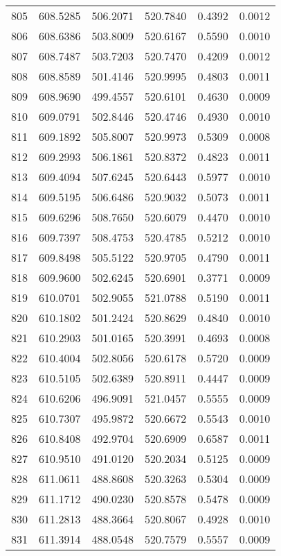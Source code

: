 \documentclass{article}
\begin{document}
\begin{longtable}{|c|c|c|c|c|c|}
805 & 608.5285 & 506.2071 & 520.7840 & 0.4392 & 0.0012 \\
806 & 608.6386 & 503.8009 & 520.6167 & 0.5590 & 0.0010 \\
807 & 608.7487 & 503.7203 & 520.7470 & 0.4209 & 0.0012 \\
808 & 608.8589 & 501.4146 & 520.9995 & 0.4803 & 0.0011 \\
809 & 608.9690 & 499.4557 & 520.6101 & 0.4630 & 0.0009 \\
810 & 609.0791 & 502.8446 & 520.4746 & 0.4930 & 0.0010 \\
811 & 609.1892 & 505.8007 & 520.9973 & 0.5309 & 0.0008 \\
812 & 609.2993 & 506.1861 & 520.8372 & 0.4823 & 0.0011 \\
813 & 609.4094 & 507.6245 & 520.6443 & 0.5977 & 0.0010 \\
814 & 609.5195 & 506.6486 & 520.9032 & 0.5073 & 0.0011 \\
815 & 609.6296 & 508.7650 & 520.6079 & 0.4470 & 0.0010 \\
816 & 609.7397 & 508.4753 & 520.4785 & 0.5212 & 0.0010 \\
817 & 609.8498 & 505.5122 & 520.9705 & 0.4790 & 0.0011 \\
818 & 609.9600 & 502.6245 & 520.6901 & 0.3771 & 0.0009 \\
819 & 610.0701 & 502.9055 & 521.0788 & 0.5190 & 0.0011 \\
820 & 610.1802 & 501.2424 & 520.8629 & 0.4840 & 0.0010 \\
821 & 610.2903 & 501.0165 & 520.3991 & 0.4693 & 0.0008 \\
822 & 610.4004 & 502.8056 & 520.6178 & 0.5720 & 0.0009 \\
823 & 610.5105 & 502.6389 & 520.8911 & 0.4447 & 0.0009 \\
824 & 610.6206 & 496.9091 & 521.0457 & 0.5555 & 0.0009 \\
825 & 610.7307 & 495.9872 & 520.6672 & 0.5543 & 0.0010 \\
826 & 610.8408 & 492.9704 & 520.6909 & 0.6587 & 0.0011 \\
827 & 610.9510 & 491.0120 & 520.2034 & 0.5125 & 0.0009 \\
828 & 611.0611 & 488.8608 & 520.3263 & 0.5304 & 0.0009 \\
829 & 611.1712 & 490.0230 & 520.8578 & 0.5478 & 0.0009 \\
830 & 611.2813 & 488.3664 & 520.8067 & 0.4928 & 0.0010 \\
831 & 611.3914 & 488.0548 & 520.7579 & 0.5557 & 0.0009 \\

\end{longtable}
\end{document}

